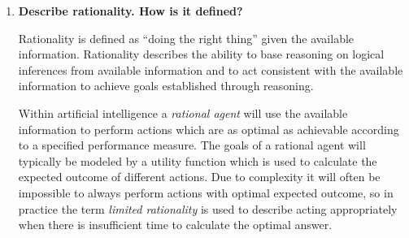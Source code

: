 \begin{enumerate}
Further, the truth of each atomic sentence can be defined in terms of \textit{reference} and \textit{satisfation}. If the language \textbf{L} is now set to contain the two terms ``snow'' and ``grass'', and the predicates ``is white'' and ``is green''; then truth for atomic sentences can be defined as follows:

\begin{enumerate}
\item Base clauses:
\begin{itemize}
\item Term: $\Quinequote{\text{\eenskip{}Snow}}$ refers to snow.
\item Term: $\Quinequote{\text{\eenskip{}Grass}}$ refers to grass.
\item Predicate: $a$ satisfies $\Quinequote{\text{\eenskip{}is white}}$ if and only if $a$ is white.
\item Predicate: $a$ satisfies $\Quinequote{\text{\eenskip{}is green}}$ if and only if $a$ is green.
\end{itemize}
\item An atomic sentence  is true if and only if the referent of $\Quinequote{T}$ satisfies $\Quinequote{P}$.
\end{enumerate}

This shows an example of how objects in the real world can be referenced from within formal languages and how Tarski's theory can be used to evaluate the truth of such sentences.

\textit{References: http://plato.stanford.edu/entries/truth/}

\item \textbf{Describe rationality. How is it defined?}

Rationality is defined as ``doing the right thing'' given the available information. Rationality describes the ability to base reasoning on logical inferences from available information and to act consistent with the available information to achieve goals established through reasoning.

Within artificial intelligence a \textit{rational agent} will use the available information to perform actions which are as optimal as achievable according to a specified performance measure. The goals of a rational agent will typically be modeled by a utility function which is used to calculate the expected outcome of different actions. Due to complexity it will often be impossible to always perform actions with optimal expected outcome, so in practice the term \textit{limited rationality} is used to describe acting appropriately when there is insufficient time to calculate the optimal answer.


\end{enumerate}
